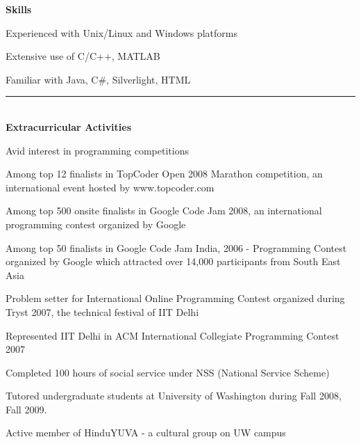 \documentclass[11pt]{article}
\newenvironment{itemize*}%
  {\begin{itemize}%
    \setlength{\itemsep}{0pt}%
    \setlength{\parskip}{0pt}%
	}
  {\end{itemize}}
\begin{document}
{\large \textbf{Skills}}
\begin{itemize*}
\item Experienced with Unix/Linux and Windows platforms
\item Extensive use of C/C++, MATLAB
\item Familiar with Java, C\#, Silverlight, HTML
\end{itemize*}
\rule{\textwidth}{2pt}
\\
\vspace{0.10in}
{\large \textbf{Extracurricular Activities}}
\begin{itemize*}
	\item Avid interest in programming competitions  
	\begin{itemize*}
	\item Among top 12 finalists in TopCoder Open 2008 Marathon competition, an international event hosted by www.topcoder.com 
	\item Among top 500 onsite finalists in Google Code Jam 2008, an international programming contest organized by Google
	\item Among top 50 finalists in Google Code Jam India, 2006 - Programming Contest organized by Google which attracted over 14,000 participants from South East Asia
\item Problem setter for International Online Programming Contest organized during Tryst 2007, the technical festival of IIT Delhi
	\item Represented IIT Delhi in ACM International Collegiate Programming Contest 2007 
	\end{itemize*}
	\item Completed 100 hours of social service under NSS (National Service Scheme)
	\item Tutored undergraduate students at University of Washington during Fall 2008, Fall 2009.
	\item Active member of HinduYUVA - a cultural group on UW campus
\end{itemize*}
\end{document}
